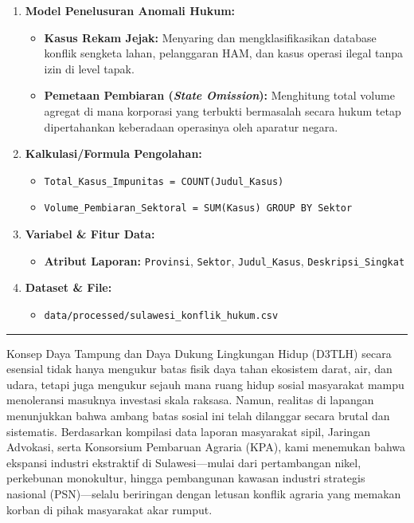 \documentclass[
]{article}
\providecommand{\tightlist}{%
  \setlength{\itemsep}{0pt}\setlength{\parskip}{0pt}}
\begin{document}
\begin{enumerate}
\def\labelenumi{\arabic{enumi}.}
\tightlist
\item
  \textbf{Model Penelusuran Anomali Hukum:}

  \begin{itemize}
  \tightlist
  \item
    \textbf{Kasus Rekam Jejak:} Menyaring dan mengklasifikasikan
    database konflik sengketa lahan, pelanggaran HAM, dan kasus operasi
    ilegal tanpa izin di level tapak.
  \item
    \textbf{Pemetaan Pembiaran (\emph{State Omission}):} Menghitung
    total volume agregat di mana korporasi yang terbukti bermasalah
    secara hukum tetap dipertahankan keberadaan operasinya oleh aparatur
    negara.
  \end{itemize}
\item
  \textbf{Kalkulasi/Formula Pengolahan:}

  \begin{itemize}
  \tightlist
  \item
    \texttt{Total\_Kasus\_Impunitas\ =\ COUNT(Judul\_Kasus)}
  \item
    \texttt{Volume\_Pembiaran\_Sektoral\ =\ SUM(Kasus)\ GROUP\ BY\ Sektor}
  \end{itemize}
\item
  \textbf{Variabel \& Fitur Data:}

  \begin{itemize}
  \tightlist
  \item
    \textbf{Atribut Laporan:} \texttt{Provinsi}, \texttt{Sektor},
    \texttt{Judul\_Kasus}, \texttt{Deskripsi\_Singkat}
  \end{itemize}
\item
  \textbf{Dataset \& File:}

  \begin{itemize}
  \tightlist
  \item
    \texttt{data/processed/sulawesi\_konflik\_hukum.csv}
  \end{itemize}
\end{enumerate}

\begin{center}\rule{0.5\linewidth}{0.5pt}\end{center}

Konsep Daya Tampung dan Daya Dukung Lingkungan Hidup (D3TLH) secara
esensial tidak hanya mengukur batas fisik daya tahan ekosistem darat,
air, dan udara, tetapi juga mengukur sejauh mana ruang hidup sosial
masyarakat mampu menoleransi masuknya investasi skala raksasa. Namun,
realitas di lapangan menunjukkan bahwa ambang batas sosial ini telah
dilanggar secara brutal dan sistematis. Berdasarkan kompilasi data
laporan masyarakat sipil, Jaringan Advokasi, serta Konsorsium Pembaruan
Agraria (KPA), kami menemukan bahwa ekspansi industri ekstraktif di
Sulawesi---mulai dari pertambangan nikel, perkebunan monokultur, hingga
pembangunan kawasan industri strategis nasional (PSN)---selalu
beriringan dengan letusan konflik agraria yang memakan korban di pihak
masyarakat akar rumput.
\end{document}
